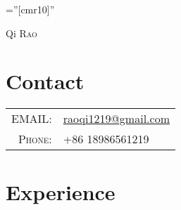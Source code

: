 \documentclass[a4paper,10pt]{article}
\begin{document}

\pagestyle{empty} %

\font\fb=''[cmr10]'' %

\par{\centering
		{\Huge Qi \textsc{Rao}
	}\bigskip\par}

\section{Contact}

\begin{tabular}{rl}
    \textsc{EMAIL:} & \href{mailto:raoqi1219@gmail.com}{raoqi1219@gmail.com}\\
    \textsc{Phone:}     & +86 18986561219\\
\end{tabular}

\section{Experience}
\end{document}
